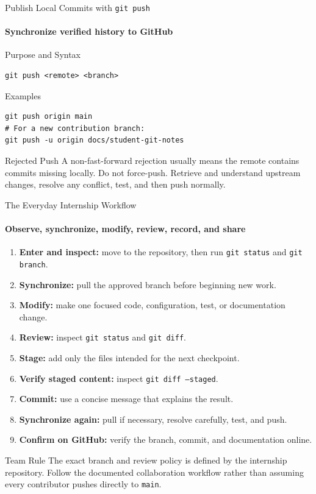 \begin{frame}[fragile]{Publish Local Commits with \texttt{git push}}
\framesubtitle{Synchronize verified history to GitHub}
\footnotesize
\begin{block}{Purpose and Syntax}
\begin{verbatim}
git push <remote> <branch>
\end{verbatim}
\end{block}
\begin{exampleblock}{Examples}
\begin{verbatim}
git push origin main
# For a new contribution branch:
git push -u origin docs/student-git-notes
\end{verbatim}
\end{exampleblock}
\begin{alertblock}{Rejected Push}
A non-fast-forward rejection usually means the remote contains commits missing locally. Do not force-push. Retrieve and understand upstream changes, resolve any conflict, test, and then push normally.
\end{alertblock}
\end{frame}

\begin{frame}{The Everyday Internship Workflow}
\framesubtitle{Observe, synchronize, modify, review, record, and share}
\scriptsize
\begin{enumerate}\setlength{\itemsep}{0.28em}
\item \textbf{Enter and inspect:} move to the repository, then run \texttt{git status} and \texttt{git branch}.
\item \textbf{Synchronize:} pull the approved branch before beginning new work.
\item \textbf{Modify:} make one focused code, configuration, test, or documentation change.
\item \textbf{Review:} inspect \texttt{git status} and \texttt{git diff}.
\item \textbf{Stage:} add only the files intended for the next checkpoint.
\item \textbf{Verify staged content:} inspect \texttt{git diff --staged}.
\item \textbf{Commit:} use a concise message that explains the result.
\item \textbf{Synchronize again:} pull if necessary, resolve carefully, test, and push.
\item \textbf{Confirm on GitHub:} verify the branch, commit, and documentation online.
\end{enumerate}
\begin{alertblock}{Team Rule}
The exact branch and review policy is defined by the internship repository. Follow the documented collaboration workflow rather than assuming every contributor pushes directly to \texttt{main}.
\end{alertblock}
\end{frame}


